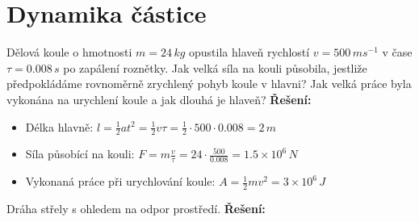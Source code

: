 \chapter{Dynamika částice}
\minitoc
\newpage
  \begin{example} Dělová koule o hmotnosti $m = 24\,kg$ opustila hlaveň rychlostí $v = 500\,ms^{-1}$ v čase $\tau=0.008\,s$ po zapálení roznětky. Jak velká síla na kouli působila, jestliže předpokládáme rovnoměrně zrychlený pohyb koule v hlavni? Jak velká práce byla vykonána na urychlení koule a jak dlouhá je hlaveň?\newline
  \textbf{Řešení:}
    \begin{itemize}
      \item Délka hlavně: $l=\frac{1}{2}at^2=\frac{1}{2}v\tau=\frac{1}{2}\cdot500\cdot0.008=2\,m$
      \item Síla působící na kouli: $F=m\frac{v}{\tau}=24\cdot\frac{500}{0.008}=1.5\times10^6\,N$
      \item Vykonaná práce při urychlování koule: $A=\frac{1}{2}mv^2=3\times10^6\,J$
    \end{itemize}
  \end{example}
  \begin{example}Dráha střely s ohledem na odpor prostředí. \newline
    \textbf{Řešení:}
  \end{example} 